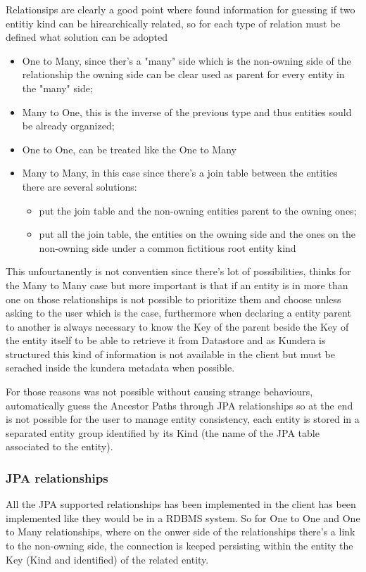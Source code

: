 \newparagraph Relationsips are clearly a good point where found information for guessing if two entitiy kind can be hirearchically related, so for each type of relation must be defined what solution can be adopted
\begin{itemize}
\item One to Many, since ther's a "many" side which is the non-owning side of the relationship the owning side can be clear used as parent for every entity in the "many" side;
\item Many to One, this is the inverse of the previous type and thus entities sould be already organized;
\item One to One, can be treated like the One to Many
\item Many to Many, in this case since there's a join table between the entities there are several solutions:
\begin{itemize}
\item put the join table and the non-owning entities parent to the owning ones;
\item put all the join table, the entities on the owning side and the ones on the non-owning side under a common fictitious root entity kind
\end{itemize}
\end{itemize}

\newparagraph This unfourtanently is not conventien since there's lot of possibilities, thinks for the Many to Many case but more important is that if an entity is in more than one on those relationships is not possible to prioritize them and choose unless asking to the user which is the case, furthermore when declaring a entity parent to another is always necessary to know the Key of the parent beside the Key of the entity itself to be able to retrieve it from Datastore and as Kundera is structured this kind of information is not available in the client but must be serached inside the kundera metadata when possible.

\noindent For those reasons was not possible without causing strange behaviours, automatically guess the Ancestor Paths through JPA relationships so at the end is not possible for the user to manage entity consistency, each entity is stored in a separated entity group identified by its Kind (the name of the JPA table associated to the entity).

\subsubsection{JPA relationships}
All the JPA supported relationships has been implemented in the client has been implemented like they would be in a RDBMS system.
So for One to One and One to Many relationships, where on the onwer side of the relationships there's a link to the non-owning side, the connection is keeped persisting within the entity the Key (Kind and identified) of the related entity.


